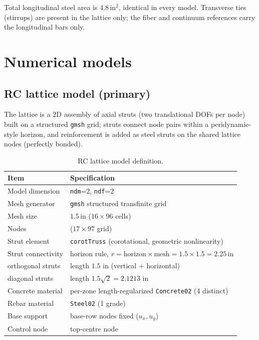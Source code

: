 \documentclass[11pt]{article}
\newcommand{\unit}[1]{\,\mathrm{#1}}
\newcommand{\code}[1]{\texttt{#1}}
\begin{document}
Total longitudinal steel area is $4.8\unit{in^2}$, identical in every model. Transverse ties
(stirrups) are present in the lattice only; the fiber and continuum references carry the
longitudinal bars only.

\section{Numerical models}

\subsection{RC lattice model (primary)}
\label{sec:lattice}

The lattice is a 2D assembly of axial struts (two translational DOFs per node) built on a
structured \code{gmsh} grid; struts connect node pairs within a peridynamic-style horizon, and
reinforcement is added as steel struts on the shared lattice nodes (perfectly bonded).

\begin{table}[H]
\centering
\caption{RC lattice model definition.}
\begin{tabular}{>{\raggedright\arraybackslash}p{4.4cm} >{\raggedright\arraybackslash}p{10.8cm}}
\toprule
Item & Specification \\
\midrule
Model dimension      & \code{ndm}=2, \code{ndf}=2 \\
Mesh generator       & \code{gmsh} structured transfinite grid \\
Mesh size            & $1.5\unit{in}$ ($16\times96$ cells) \\
Nodes                & 1649 ($17\times97$ grid) \\
Strut element        & \code{corotTruss} (corotational, geometric nonlinearity) \\
Strut connectivity   & horizon rule, $r = \text{horizon}\times\text{mesh} = 1.5\times1.5 = 2.25\unit{in}$ \\
\quad orthogonal struts & length $1.5$ in (vertical + horizontal) \\
\quad diagonal struts   & length $1.5\sqrt{2}=2.1213$ in \\
Concrete material    & per-zone length-regularized \code{Concrete02} (4 distinct) \\
Rebar material       & \code{Steel02} (1 grade) \\
Base support         & 17 base-row nodes fixed ($u_x,u_y$) \\
Control node         & top-centre node \\
\bottomrule
\end{tabular}
\end{table}
\end{document}
